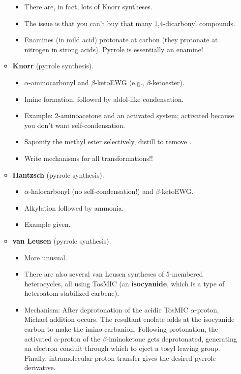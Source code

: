 \documentclass[../notes.tex]{subfiles}
\begin{document}
\begin{itemize}
\begin{itemize}
\begin{itemize}
            \item There are, in fact, lots of Knorr syntheses.
            \item The issue is that you can't buy that many 1,4-dicarbonyl compounds.
            \item Enamines (in mild acid) protonate at carbon (they protonate at nitrogen in strong acids). Pyrrole is essentially an enamine!
        \end{itemize}
        \item \textbf{Knorr} (pyrrole synthesis).
        \begin{itemize}
            \item $\alpha$-aminocarbonyl and $\beta$-ketoEWG (e.g., $\beta$-ketoester).
            \item Imine formation, followed by aldol-like condensation.
            \item Example: 2-aminoacetone and an activated system; activated because you don't want self-condensation.
            \item Saponify the methyl ester selectively, distill to remove .
            \item Write mechanisms for all transformations!!
        \end{itemize}
        \item \textbf{Hantzsch} (pyrrole synthesis).
        \begin{itemize}
            \item $\alpha$-halocarbonyl (no self-condensation!) and $\beta$-ketoEWG.
            \item Alkylation followed by ammonia.
            \item Example given.
        \end{itemize}
        \item \textbf{van Leusen} (pyrrole synthesis).
        \begin{itemize}
            \item More unusual.
            \item There are also several van Leusen syntheses of 5-membered heterocycles, all using TosMIC (an \textbf{isocyanide}, which is a type of heteroatom-stabilized carbene).
            \item Mechanism: After deprotonation of the acidic TosMIC $\alpha$-proton, Michael addition occurs. The resultant enolate adds at the isocyanide carbon to make the imino carbanion. Following protonation, the activated $\alpha$-proton of the $\beta$-iminoketone gets deprotonated, generating an electron conduit through which to eject a tosyl leaving group. Finally, intramolecular proton transfer gives the desired pyrrole derivative.

\end{itemize}
\end{itemize}
\end{itemize}
\end{document}
